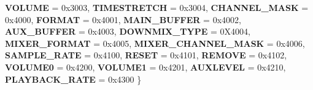 \begin{DoxyCompactItemize}
\newline
{\bfseries V\+O\+L\+U\+ME} = 0x3003, 
{\bfseries T\+I\+M\+E\+S\+T\+R\+E\+T\+CH} = 0x3004, 
{\bfseries C\+H\+A\+N\+N\+E\+L\+\_\+\+M\+A\+SK} = 0x4000, 
{\bfseries F\+O\+R\+M\+AT} = 0x4001, 
\newline
{\bfseries M\+A\+I\+N\+\_\+\+B\+U\+F\+F\+ER} = 0x4002, 
{\bfseries A\+U\+X\+\_\+\+B\+U\+F\+F\+ER} = 0x4003, 
{\bfseries D\+O\+W\+N\+M\+I\+X\+\_\+\+T\+Y\+PE} = 0\+X4004, 
{\bfseries M\+I\+X\+E\+R\+\_\+\+F\+O\+R\+M\+AT} = 0x4005, 
\newline
{\bfseries M\+I\+X\+E\+R\+\_\+\+C\+H\+A\+N\+N\+E\+L\+\_\+\+M\+A\+SK} = 0x4006, 
{\bfseries S\+A\+M\+P\+L\+E\+\_\+\+R\+A\+TE} = 0x4100, 
{\bfseries R\+E\+S\+ET} = 0x4101, 
{\bfseries R\+E\+M\+O\+VE} = 0x4102, 
\newline
{\bfseries V\+O\+L\+U\+M\+E0} = 0x4200, 
{\bfseries V\+O\+L\+U\+M\+E1} = 0x4201, 
{\bfseries A\+U\+X\+L\+E\+V\+EL} = 0x4210, 
{\bfseries P\+L\+A\+Y\+B\+A\+C\+K\+\_\+\+R\+A\+TE} = 0x4300
 \}
\end{DoxyCompactItemize}
